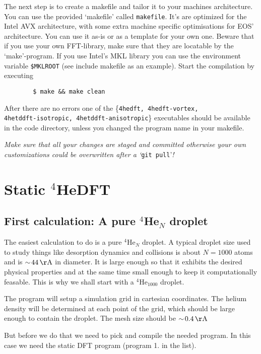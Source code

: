 \documentclass[10pt,a4paper]{article}
\begin{document}
	The next step is to create a makefile and tailor it to your machines architecture. You can use the provided `makefile' called \verb|makefile|. It's are optimized for the Intel AVX architecture, with some extra machine specific optimisations for EOS' architecture. You can use it as-is or as a template for your own one. Beware that if you use your own FFT-library, make sure that they are locatable by the `make'-program. If you use Intel's MKL library you can use the environment variable \verb|$MKLROOT| (see include makefile as an example). Start the compilation by executing
	\begin{verbatim}
		$ make && make clean
	\end{verbatim}
	After there are no errors one of the \{\verb|4hedft, 4hedft-vortex,| \\ \verb|4hetddft-isotropic, 4hetddft-anisotropic|\} executables should be available in the code directory, unless you changed the program name in your makefile.

	\emph{Make sure that all your changes are staged and committed otherwise your own customizations could be overwritten after a `}\verb|git pull|'\emph{!}
	
	\section{Static $^4$HeDFT}
	
	\subsection{First calculation: A pure $^4$He$_N$ droplet}
	The easiest calculation to do is a pure $^4$He$_N$ droplet. A typical droplet size used to study things like desorption dynamics and collisions is about $N=1000$ atoms and is $\sim\!44\,\mathrm{\AA}$ in diameter. It is large enough so that it exhibits the desired physical properties and at the same time small enough to keep it computationally feasable. This is why we shall start with a $^4$He$_{1000}$ droplet.
	
	The program will setup a simulation grid in cartesian coordinates. The helium density will be determined at each point of the grid, which should be large enough to contain the droplet. The mesh size should be $\sim\!0.4\,\mathrm{\AA}$
	
	But before we do that we need to pick and compile the needed program. In this case we need the static DFT program (program 1. in the list).
	
\end{document}
